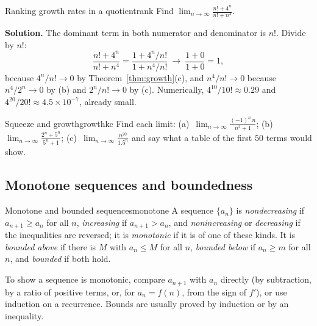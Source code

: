 \documentclass[11pt]{article}
\begin{document}
\begin{exmp}{Ranking growth rates in a quotient}{rank}
Find $\displaystyle\lim_{n\to\infty}\frac{n!+4^n}{n!+n^4}$.

\textbf{Solution.} The dominant term in both numerator and denominator is $n!$. Divide by $n!$:
\[
\frac{n!+4^n}{n!+n^4}=\frac{1+4^n/n!}{1+n^4/n!}\ \longrightarrow\ \frac{1+0}{1+0}=1,
\]
because $4^n/n!\to0$ by Theorem~\ref{thm:growth}(c), and $n^4/n!\to0$ because $n^4/2^n\to0$ by (b) and $2^n/n!\to0$ by (c). Numerically, $4^{10}/10!\approx0.29$ and $4^{20}/20!\approx4.5\times10^{-7}$, already small.
\end{exmp}

\begin{kc}{Squeeze and growth}{growthkc}
Find each limit: (a)~$\displaystyle\lim_{n\to\infty}\frac{(-1)^n\,n}{n^2+1}$; \quad (b)~$\displaystyle\lim_{n\to\infty}\frac{2^n+5^n}{5^n+1}$; \quad (c)~$\displaystyle\lim_{n\to\infty}\frac{n^{20}}{1.5^n}$ and say what a table of the first $50$ terms would show.
\end{kc}

\subsection*{Monotone sequences and boundedness}

\begin{defn}{Monotone and bounded sequences}{monotone}
A sequence $\{a_n\}$ is \emph{nondecreasing} if $a_{n+1}\ge a_n$ for all $n$, \emph{increasing} if $a_{n+1}>a_n$, and \emph{nonincreasing} or \emph{decreasing} if the inequalities are reversed; it is \emph{monotonic} if it is of one of these kinds. It is \emph{bounded above} if there is $M$ with $a_n\le M$ for all $n$, \emph{bounded below} if $a_n\ge m$ for all $n$, and \emph{bounded} if both hold.
\end{defn}

To show a sequence is monotonic, compare $a_{n+1}$ with $a_n$ directly (by subtraction, by a ratio of positive terms, or, for $a_n=f(n)$, from the sign of $f'$), or use induction on a recurrence. Bounds are usually proved by induction or by an inequality.
\end{document}
